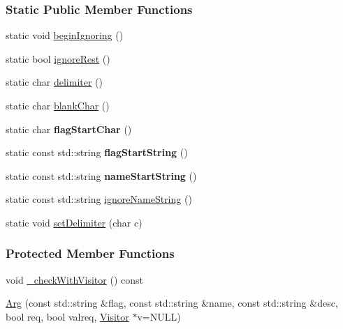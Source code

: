\subsubsection*{Static Public Member Functions}
\begin{DoxyCompactItemize}
\item 
static void \hyperlink{classTCLAP_1_1Arg_a24165d31c1ec70777fb201356b6cdf6a}{begin\+Ignoring} ()
\item 
static bool \hyperlink{classTCLAP_1_1Arg_a4d412155b8f9b4956e64e91c48e55a3b}{ignore\+Rest} ()
\item 
static char \hyperlink{classTCLAP_1_1Arg_aadef6ca7e40f5b3d3fd03186976aea7e}{delimiter} ()
\item 
static char \hyperlink{classTCLAP_1_1Arg_a0abd38f46dbf7d267078134a4817fbb2}{blank\+Char} ()
\item 
static char {\bfseries flag\+Start\+Char} ()\hypertarget{classTCLAP_1_1Arg_a7f9f6af439993e9151bd5a6cd2a63dad}{}\label{classTCLAP_1_1Arg_a7f9f6af439993e9151bd5a6cd2a63dad}

\item 
static const std\+::string {\bfseries flag\+Start\+String} ()\hypertarget{classTCLAP_1_1Arg_af8e739295b0f75028e7bff6d670d97a1}{}\label{classTCLAP_1_1Arg_af8e739295b0f75028e7bff6d670d97a1}

\item 
static const std\+::string {\bfseries name\+Start\+String} ()\hypertarget{classTCLAP_1_1Arg_a1df2134870528b80f9f35347fef6fd14}{}\label{classTCLAP_1_1Arg_a1df2134870528b80f9f35347fef6fd14}

\item 
static const std\+::string \hyperlink{classTCLAP_1_1Arg_a6ce0cbe4effd44679ca11f25e3c318e7}{ignore\+Name\+String} ()
\item 
static void \hyperlink{classTCLAP_1_1Arg_ad059b63424001b9aedb4c019e2854c3c}{set\+Delimiter} (char c)
\end{DoxyCompactItemize}
\subsubsection*{Protected Member Functions}
\begin{DoxyCompactItemize}
\item 
void \hyperlink{classTCLAP_1_1Arg_aa963d0d4c8cb297e1f4cf74143bf6d1b}{\+\_\+check\+With\+Visitor} () const 
\item 
\hyperlink{classTCLAP_1_1Arg_ab25a06db5edf82a5b965b641b3c63372}{Arg} (const std\+::string \&flag, const std\+::string \&name, const std\+::string \&desc, bool req, bool valreq, \hyperlink{classTCLAP_1_1Visitor}{Visitor} $\ast$v=N\+U\+LL)
\end{DoxyCompactItemize}
